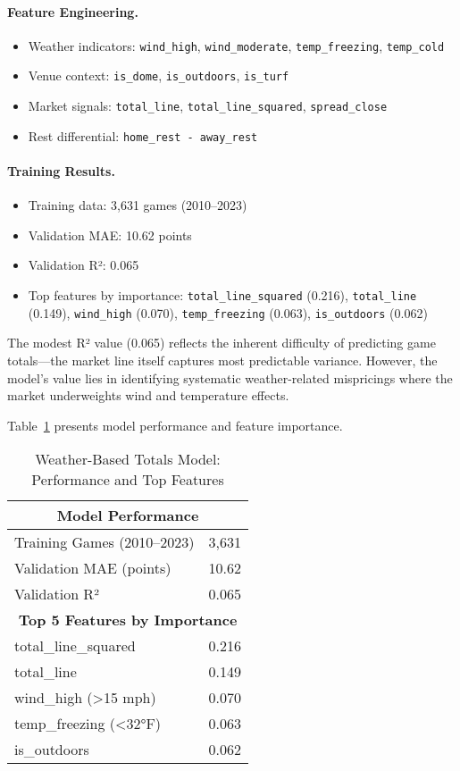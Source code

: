 \paragraph{Feature Engineering.}
\begin{itemize}
  \item Weather indicators: \texttt{wind\_high}, \texttt{wind\_moderate}, \texttt{temp\_freezing}, \texttt{temp\_cold}
  \item Venue context: \texttt{is\_dome}, \texttt{is\_outdoors}, \texttt{is\_turf}
  \item Market signals: \texttt{total\_line}, \texttt{total\_line\_squared}, \texttt{spread\_close}
  \item Rest differential: \texttt{home\_rest - away\_rest}
\end{itemize}

\paragraph{Training Results.}
\begin{itemize}
  \item Training data: 3,631 games (2010--2023)
  \item Validation MAE: 10.62 points
  \item Validation R²: 0.065
  \item Top features by importance: \texttt{total\_line\_squared} (0.216), \texttt{total\_line} (0.149), \texttt{wind\_high} (0.070), \texttt{temp\_freezing} (0.063), \texttt{is\_outdoors} (0.062)
\end{itemize}

The modest R² value (0.065) reflects the inherent difficulty of predicting game totals---the market line itself captures most predictable variance. However, the model's value lies in identifying systematic weather-related mispricings where the market underweights wind and temperature effects.

Table~\ref{tab:weather-totals-performance} presents model performance and feature importance.

\begin{table}[htbp]
\centering
\caption{Weather-Based Totals Model: Performance and Top Features}
\label{tab:weather-totals-performance}
\begin{tabular}{@{} l r @{}}
\toprule
\multicolumn{2}{c}{\textbf{Model Performance}} \\
\midrule
Training Games (2010--2023) & 3,631 \\
Validation MAE (points) & 10.62 \\
Validation R² & 0.065 \\
\midrule
\multicolumn{2}{c}{\textbf{Top 5 Features by Importance}} \\
\midrule
total\_line\_squared & 0.216 \\
total\_line & 0.149 \\
wind\_high (>15 mph) & 0.070 \\
temp\_freezing (<32°F) & 0.063 \\
is\_outdoors & 0.062 \\
\bottomrule
\end{tabular}
\end{table}


